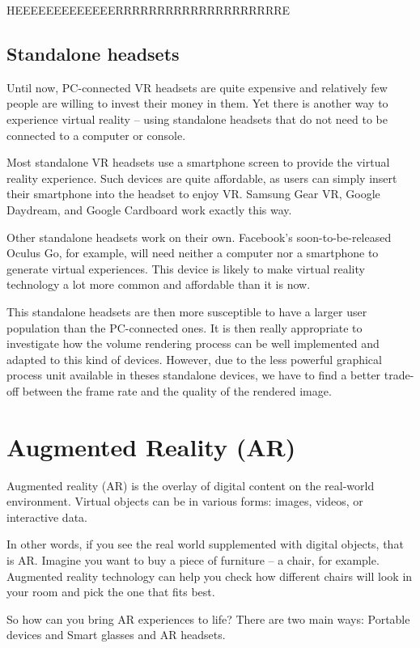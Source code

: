 HEEEEEEEEEEEEERRRRRRRRRRRRRRRRRRRRE

\subsection{Standalone headsets}

Until now, PC-connected VR headsets are quite expensive and relatively few people are willing to invest their money in them. Yet there is another way to experience virtual reality – using standalone headsets that do not need to be connected to a computer or console.

Most standalone VR headsets use a smartphone screen to provide the virtual reality experience. Such devices are quite affordable, as users can simply insert their smartphone into the headset to enjoy VR. Samsung Gear VR, Google Daydream, and Google Cardboard work exactly this way.

Other standalone headsets work on their own. Facebook's soon-to-be-released Oculus Go, for example, will need neither a computer nor a smartphone to generate virtual experiences. This device is likely to make virtual reality technology a lot more common and affordable than it is now.

This standalone headsets are then more susceptible to have a larger user population than the PC-connected ones. It is then really appropriate to investigate how the volume rendering process can be well implemented and adapted to this kind of devices. However, due to the less powerful graphical process unit available in theses standalone devices, we have to find a better trade-off between the frame rate and the quality of the rendered image. 


\section{ Augmented Reality (AR)}

Augmented reality (AR) is the overlay of digital content on the real-world environment. Virtual objects can be in various forms: images, videos, or interactive data.


In other words, if you see the real world supplemented with digital objects, that is AR. Imagine you want to buy a piece of furniture – a chair, for example. Augmented reality technology can help you check how different chairs will look in your room and pick the one that fits best.


So how can you bring AR experiences to life? There are two main ways: Portable devices and Smart glasses and AR headsets. 


